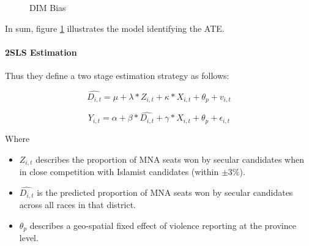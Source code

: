 \documentclass{scrartcl}
\begin{document}
\begin{figure}[h]
  \centering
  \caption{DIM Bias}
  \label{fig:ate_iv}
\end{figure}

In sum, figure \ref{fig:ate_iv} illustrates the model identifying the ATE.

\paragraph{2SLS Estimation}

Thus they define a two stage estimation strategy as follows:


\begin{equation} \label{eq:2}
  \widehat{D_{i,t}} = \mu + \lambda * Z_{i,t} + \kappa*X_{i,t} + \theta_p + v_{i,t}
\end{equation}

 \begin{equation} \label{eq:3}
  Y_{i,t} = \alpha + \beta * \widehat{D_{i,t}} + \gamma*X_{i,t} + \theta_{p} + \epsilon_{i,t}
\end{equation}

Where

\begin{itemize}
\item $Z_{i,t}$ describes the proportion of MNA seats won by secular candidates when in close competition with Islamist candidates (within $\pm 3\%$).
\item $\widehat{D_{i,t}}$ is the predicted proportion of MNA seats won by secular candidates across all races in that district.
\item $\theta_p$ describes a geo-spatial fixed effect of violence reporting at the province level. 
\end{itemize}
\end{document}
